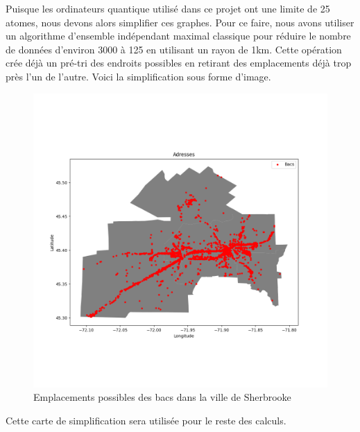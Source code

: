 \documentclass[11pt]{article}
\begin{document}
Puisque les ordinateurs quantique utilisé dans ce projet ont une limite de 25 atomes, nous devons alors simplifier ces graphes. Pour ce faire, nous avons utiliser un algorithme d'ensemble indépendant maximal classique pour réduire le nombre de données d'environ 3000 à 125 en utilisant un rayon de 1km. Cette opération crée déjà un pré-tri des endroits possibles en retirant des emplacements déjà trop près l'un de l'autre. Voici la simplification sous forme d'image. 

 \begin{figure}[H]
    \centering
        \includegraphics[width=0.5\linewidth]{images/commerces.png}
        \caption{Emplacements possibles des bacs dans la ville de Sherbrooke}
    \label{bacs_possibles_total}
\end{figure}


Cette carte de simplification sera utilisée pour le reste des calculs.
\end{document}
